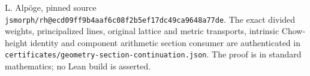L. Alp\"oge, pinned source
\texttt{jsmorph/rh@ecd09ff9b4aaf6c08f2b5ef17dc49ca9648a77de}.
The exact divided weights, principalized lines, original lattice and
metric transports, intrinsic Chow-height identity and component
arithmetic section consumer are authenticated in
\texttt{certificates/geometry-section-continuation.json}.
The proof is in standard mathematics; no Lean build is asserted.
